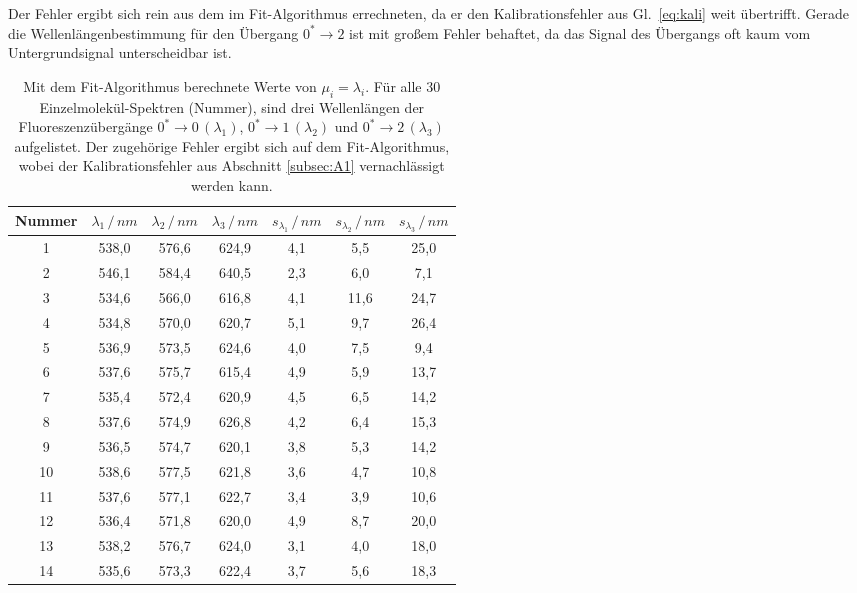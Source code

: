 Der Fehler ergibt sich rein aus dem im Fit-Algorithmus errechneten, da er den 
Kalibrationsfehler aus Gl.~\ref{eq:kali} weit übertrifft. Gerade die Wellenlängenbestimmung für den 
Übergang $0^{*}\rightarrow 2$ ist mit großem Fehler behaftet, da das Signal des Übergangs oft kaum vom Untergrundsignal 
unterscheidbar ist. 
\begin{table}[h!]
    \centering
    \caption{\label{tab:lamda}Mit dem Fit-Algorithmus berechnete Werte von $\mu_{i} = \lambda_{i}$. Für alle 30 Einzelmolekül-Spektren (Nummer),
    sind drei Wellenlängen der Fluoreszenzübergänge $0^{*}\rightarrow0\,(\lambda_{1})$, $0^{*}\rightarrow1\,(\lambda_{2})$ und 
    $0^{*}\rightarrow2\,(\lambda_{3})$ aufgelistet. Der zugehörige Fehler ergibt sich auf dem Fit-Algorithmus, wobei 
    der Kalibrationsfehler aus Abschnitt \ref{subsec:A1} vernachlässigt werden kann.}
      \begin{tabular}{c|c|c|c|c|c|c}
      \rowcolor[rgb]{ .663,  .816,  .557} Nummer & $\lambda_{1}\,/\,\si{nm}$ & $\lambda_{2}\,/\,\si{nm}$ & $\lambda_{3}\,/\,\si{nm}$ &
      $s_{\lambda_{1}}\,/\,\si{nm}$ & $s_{\lambda_{2}}\,/\,\si{nm}$ & $s_{\lambda_{3}}\,/\,\si{nm}$ \\
      \hline \hline
      1     & 538,0 & 576,6 & 624,9 & 4,1   & 5,5   & 25,0 \\
      2     & 546,1 & 584,4 & 640,5 & 2,3   & 6,0   & 7,1 \\
      3     & 534,6 & 566,0 & 616,8 & 4,1   & 11,6  & 24,7 \\
      4     & 534,8 & 570,0 & 620,7 & 5,1   & 9,7   & 26,4 \\
      5     & 536,9 & 573,5 & 624,6 & 4,0   & 7,5   & 9,4 \\
      6     & 537,6 & 575,7 & 615,4 & 4,9   & 5,9   & 13,7 \\
      7     & 535,4 & 572,4 & 620,9 & 4,5   & 6,5   & 14,2 \\
      8     & 537,6 & 574,9 & 626,8 & 4,2   & 6,4   & 15,3 \\
      9     & 536,5 & 574,7 & 620,1 & 3,8   & 5,3   & 14,2 \\
      10    & 538,6 & 577,5 & 621,8 & 3,6   & 4,7   & 10,8 \\
      11    & 537,6 & 577,1 & 622,7 & 3,4   & 3,9   & 10,6 \\
      12    & 536,4 & 571,8 & 620,0 & 4,9   & 8,7   & 20,0 \\
      13    & 538,2 & 576,7 & 624,0 & 3,1   & 4,0   & 18,0 \\
      14    & 535,6 & 573,3 & 622,4 & 3,7   & 5,6   & 18,3 \\

\end{tabular}
\end{table}
